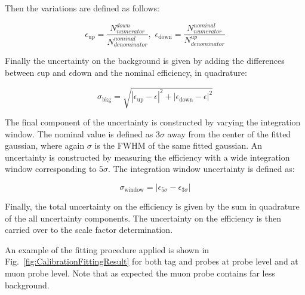 Then the variations are defined as follows:

\begin{equation}
  \epsilon_{\text{up}} = \frac{N^{down}_{numerator}}{N^{nominal}_{denominator}}\text{, }\,
  \epsilon_{\text{down}} = \frac{N^{nominal}_{numerator}}{N^{up}_{denominator}}
\end{equation}

Finally the uncertainty on the background is given by adding the differences between $\epsilon{\text{up}}$ and $\epsilon{\text{down}}$ and the nominal efficiency, in quadrature:

\begin{equation}
  \sigma_{\text{bkg}} = \sqrt{|\epsilon_{\text{up}}-\epsilon|^{2}+|\epsilon_{\text{down}}-\epsilon|^{2}}
\end{equation}

The final component of the uncertainty is constructed by varying the integration window. The nominal value is defined as $3\sigma$ away from the center of the fitted gaussian, where again $\sigma$ is the FWHM of the same fitted gaussian. An uncertainty is constructed by measuring the efficiency with a wide integration window corresponding to $5\sigma$. The integration window uncertainty is defined as:

\begin{equation}
  \sigma_{\text{window}} = |\epsilon_{5\sigma}-\epsilon_{3\sigma}|
\end{equation}

Finally, the total uncertainty on the efficiency is given by the sum in quadrature of the all uncertainty components. The uncertainty on the efficiency is then carried over to the scale factor determination.

An example of the fitting procedure applied is shown in Fig.~\ref{fig:CalibrationFittingResult} for both tag and probes at probe level and at muon probe level. Note that as expected the muon probe contains far less background.

